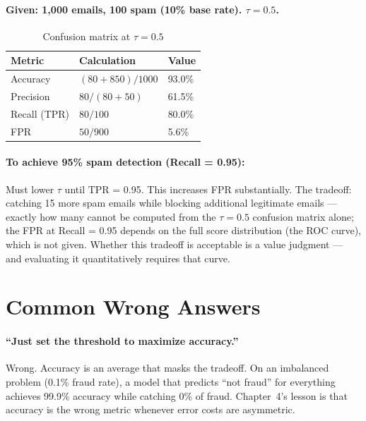 \paragraph{Given: 1,000 emails, 100 spam (10\% base rate). $\tau = 0.5$.}

\begin{table}[htbp]
\caption{Confusion matrix at $\tau = 0.5$}
\label{tab:conf-matrix-solution}
\centering
\begin{tabular}{@{}lll@{}}
\toprule
\textbf{Metric} & \textbf{Calculation} & \textbf{Value} \\
\midrule
Accuracy & $(80 + 850)/1000$ & 93.0\% \\
Precision & $80/(80+50)$ & 61.5\% \\
Recall (TPR) & $80/100$ & 80.0\% \\
FPR & $50/900$ & 5.6\% \\
\bottomrule
\end{tabular}
\end{table}

\paragraph{To achieve 95\% spam detection (Recall = 0.95):} Must lower $\tau$ until TPR = 0.95. This increases FPR substantially. The tradeoff: catching 15 more spam emails while blocking additional legitimate emails --- exactly how many cannot be computed from the $\tau = 0.5$ confusion matrix alone; the FPR at Recall = 0.95 depends on the full score distribution (the ROC curve), which is not given. Whether this tradeoff is acceptable is a value judgment --- and evaluating it quantitatively requires that curve.

\section{Common Wrong Answers}

\paragraph{``Just set the threshold to maximize accuracy.''}
Wrong. Accuracy is an average that masks the tradeoff. On an imbalanced problem (0.1\% fraud rate), a model that predicts ``not fraud'' for everything achieves 99.9\% accuracy while catching 0\% of fraud. Chapter~4's lesson is that accuracy is the wrong metric whenever error costs are asymmetric.


